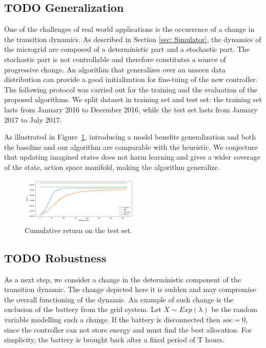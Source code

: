 \documentclass{article}
\begin{document}
\subsection{\textbf{TODO} Generalization}


One of the challenges of real world applications is the occurrence of a change in the transition dynamics. As described in Section \ref{sec: Simulator}, the dynamics of the microgrid are composed of a deterministic part and a stochastic part. The stochastic part is not controllable and therefore constitutes a source of progressive change. 
An algorithm that generalizes over an unseen data distribution can provide a good initialization for fine-tuing of the new controller.
The following protocol was carried out for the training and the evaluation of the proposed algorithms. We split dataset in training set and test set: the training set lasts from January 2016 to December 2016, while the test set lasts from January 2017 to July 2017. 

As illustrated in Figure~\ref{fig:rl-results}, introducing a model benefits generalization and both the baseline and our algorithm are comparable with the heuristic. We conjecture that updating imagined states does not harm learning and gives a wider coverage of the state, action space manifold, making the algorithm generalize.

\begin{figure}[t]
	\includegraphics[width=0.5\textwidth]{generalization.png}
	\centering
	\caption{Cumulative return on the test set.}
	\label{fig:rl-results}
\end{figure}

\subsection{\textbf{TODO} Robustness}

As a next step, we consider a change in the deterministic component of the transition dynamic.
The change depicted here it is sudden and may compromise the overall functioning of the dynamic. An example of such change is the exclusion of the battery from the grid system. Let $X \sim Exp(\lambda)$ be the random variable modelling such a change. If the battery is disconnected then $soc=0$, since the controller can not store energy and must find the best allocation. For simplicity, the battery is brought back after a fixed period of T hours.
\end{document}
